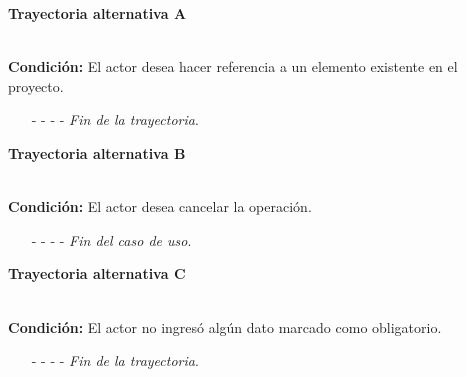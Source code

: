 \hypertarget{CU12-1-2-2:TAA}{\textbf{Trayectoria alternativa A}}\\
\noindent \textbf{Condición:} El actor desea hacer referencia a un elemento existente en el proyecto.
\begin{enumerate}
	\UCpaso[\UCactor] Ingresa el token correspondiente al elemento a referenciar.
	\UCpaso[\UCsist] Verifica que los tokens utilizados se encuentren correctamente estructurados, con base en la regla de negocio . 
	\UCpaso[\UCsist] Obtiene los \hyperlink{tElemento}{elementos} registrados en el proyecto correspondientes al token ingresado. 
	\UCpaso[\UCsist] Muestra una lista con los \hyperlink{tElemento}{elementos} encontrados.
	\UCpaso[\UCactor] Selecciona un elemento de la lista.
	\UCpaso[\UCsist] Verifica que el nombre del elemento seleccionado no contenga espacios. \hyperlink{CU12-1-2-2:TAF}{[Trayectoria F]}
	\UCpaso[\UCsist] Agrega la referencia del elemento al texto. \label{CU12.1.2.2-TA1}
	\UCpaso Continúa en el paso \ref{CU12.1.2.2-P4} de la trayectoria principal.
	\item[- -] - - {\em {Fin de la trayectoria}}.%
\end{enumerate}
\hypertarget{CU12-1-2-2:TAB}{\textbf{Trayectoria alternativa B}}\\
\noindent \textbf{Condición:} El actor desea cancelar la operación.
\begin{enumerate}
	\UCpaso[\UCactor] Solicita cancelar la operación oprimiendo el botón  de la pantalla .
	\UCpaso[\UCsist] Muestra la pantalla .
	\item[- -] - - {\em {Fin del caso de uso}}.%
\end{enumerate}
\hypertarget{CU12-1-2-2:TAC}{\textbf{Trayectoria alternativa C}}\\
\noindent \textbf{Condición:} El actor no ingresó algún dato marcado como obligatorio.
\begin{enumerate}
	\UCpaso[\UCsist] Muestra el mensaje  señalando el campo que presenta el error en la pantalla .
	\UCpaso Regresa al paso \ref{CU12.1.2.2-P3} de la trayectoria principal.
	\item[- -] - - {\em {Fin de la trayectoria}}.%
\end{enumerate}
